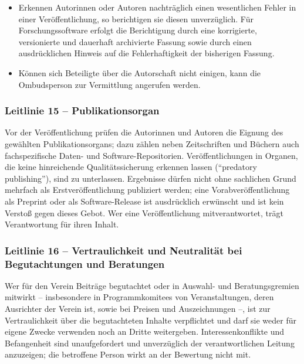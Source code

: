 \documentclass[a4paper, fontsize=11pt]{scrartcl}
\begin{document}
\begin{itemize}
\begin{itemize}
  \end{itemize}
  \item Erkennen Autorinnen oder Autoren nachträglich einen wesentlichen Fehler in einer Veröffentlichung, so berichtigen sie diesen unverzüglich. Für Forschungssoftware erfolgt die Berichtigung durch eine korrigierte, versionierte und dauerhaft archivierte Fassung sowie durch einen ausdrücklichen Hinweis auf die Fehlerhaftigkeit der bisherigen Fassung.
  \item Können sich Beteiligte über die Autorschaft nicht einigen, kann die Ombudsperson zur Vermittlung angerufen werden.
\end{itemize}

\subsubsection*{Leitlinie 15 -- Publikationsorgan}
Vor der Veröffentlichung prüfen die Autorinnen und Autoren die Eignung des gewählten Publikationsorgans; dazu zählen neben Zeitschriften und Büchern auch fachspezifische Daten- und Software-Repositorien. Veröffentlichungen in Organen, die keine hinreichende Qualitätssicherung erkennen lassen (\enquote{predatory publishing}), sind zu unterlassen. Ergebnisse dürfen nicht ohne sachlichen Grund mehrfach als Erstveröffentlichung publiziert werden; eine Vorabveröffentlichung als Preprint oder als Software-Release ist ausdrücklich erwünscht und ist kein Verstoß gegen dieses Gebot. Wer eine Veröffentlichung mitverantwortet, trägt Verantwortung für ihren Inhalt.

\subsubsection*{Leitlinie 16 -- Vertraulichkeit und Neutralität bei Begutachtungen und Beratungen}
Wer für den Verein Beiträge begutachtet oder in Auswahl- und Beratungsgremien mitwirkt -- insbesondere in Programmkomitees von Veranstaltungen, deren Ausrichter der Verein ist, sowie bei Preisen und Auszeichnungen --, ist zur Vertraulichkeit über die begutachteten Inhalte verpflichtet und darf sie weder für eigene Zwecke verwenden noch an Dritte weitergeben. Interessenkonflikte und Befangenheit sind unaufgefordert und unverzüglich der verantwortlichen Leitung anzuzeigen; die betroffene Person wirkt an der Bewertung nicht mit.
\end{document}
